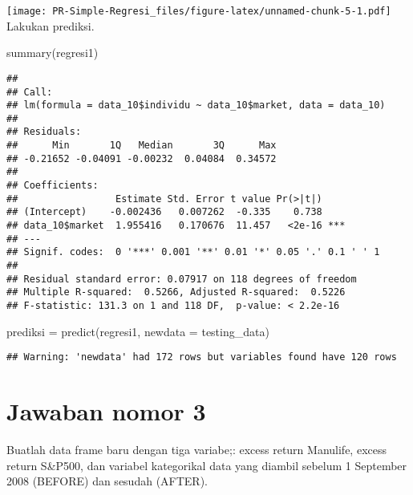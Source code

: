 \documentclass[
]{article}
\newenvironment{Shaded}{\begin{snugshade}}{\end{snugshade}}
\newcommand{\AttributeTok}[1]{\textcolor[rgb]{0.77,0.63,0.00}{#1}}
\newcommand{\FunctionTok}[1]{\textcolor[rgb]{0.00,0.00,0.00}{#1}}
\newcommand{\NormalTok}[1]{#1}
\newcommand{\OtherTok}[1]{\textcolor[rgb]{0.56,0.35,0.01}{#1}}
\newcommand{\SpecialCharTok}[1]{\textcolor[rgb]{0.00,0.00,0.00}{#1}}
\begin{document}
\texttt{[image: PR-Simple-Regresi\_files/figure-latex/unnamed-chunk-5-1.pdf]}
Lakukan prediksi.

\begin{Shaded}
\begin{Highlighting}[]
\FunctionTok{summary}\NormalTok{(regresi1)}
\end{Highlighting}
\end{Shaded}

\begin{verbatim}
## 
## Call:
## lm(formula = data_10$individu ~ data_10$market, data = data_10)
## 
## Residuals:
##      Min       1Q   Median       3Q      Max 
## -0.21652 -0.04091 -0.00232  0.04084  0.34572 
## 
## Coefficients:
##                 Estimate Std. Error t value Pr(>|t|)    
## (Intercept)    -0.002436   0.007262  -0.335    0.738    
## data_10$market  1.955416   0.170676  11.457   <2e-16 ***
## ---
## Signif. codes:  0 '***' 0.001 '**' 0.01 '*' 0.05 '.' 0.1 ' ' 1
## 
## Residual standard error: 0.07917 on 118 degrees of freedom
## Multiple R-squared:  0.5266, Adjusted R-squared:  0.5226 
## F-statistic: 131.3 on 1 and 118 DF,  p-value: < 2.2e-16
\end{verbatim}

\begin{Shaded}
\begin{Highlighting}[]
\NormalTok{prediksi }\OtherTok{=} \FunctionTok{predict}\NormalTok{(regresi1, }\AttributeTok{newdata =}\NormalTok{ testing\_data)}
\end{Highlighting}
\end{Shaded}

\begin{verbatim}
## Warning: 'newdata' had 172 rows but variables found have 120 rows
\end{verbatim}

\begin{Shaded}
\end{Shaded}

\hypertarget{jawaban-nomor-3}{%
\section{Jawaban nomor 3}\label{jawaban-nomor-3}}

Buatlah data frame baru dengan tiga variabe;: excess return Manulife,
excess return S\&P500, dan variabel kategorikal data yang diambil
sebelum 1 September 2008 (BEFORE) dan sesudah (AFTER).
\end{document}
